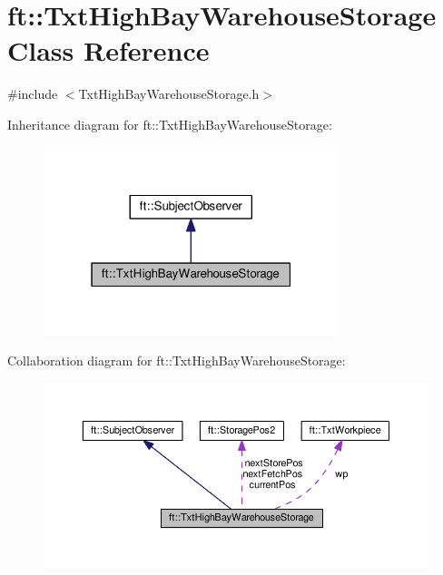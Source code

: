 \hypertarget{classft_1_1_txt_high_bay_warehouse_storage}{}\section{ft\+:\+:Txt\+High\+Bay\+Warehouse\+Storage Class Reference}
\label{classft_1_1_txt_high_bay_warehouse_storage}


{\ttfamily \#include $<$Txt\+High\+Bay\+Warehouse\+Storage.\+h$>$}



Inheritance diagram for ft\+:\+:Txt\+High\+Bay\+Warehouse\+Storage\+:
\nopagebreak
\begin{figure}[H]
\begin{center}
\leavevmode
\includegraphics[width=244pt]{classft_1_1_txt_high_bay_warehouse_storage__inherit__graph}
\end{center}
\end{figure}


Collaboration diagram for ft\+:\+:Txt\+High\+Bay\+Warehouse\+Storage\+:
\nopagebreak
\begin{figure}[H]
\begin{center}
\leavevmode
\includegraphics[width=350pt]{classft_1_1_txt_high_bay_warehouse_storage__coll__graph}
\end{center}
\end{figure}
